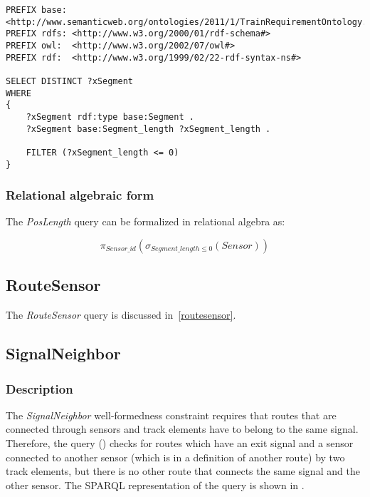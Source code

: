 
\begin{lstlisting}[caption=The PosLength query in SPARQL, label=lst:poslength-sparql]
PREFIX base: <http://www.semanticweb.org/ontologies/2011/1/TrainRequirementOntology.owl#>
PREFIX rdfs: <http://www.w3.org/2000/01/rdf-schema#>
PREFIX owl:  <http://www.w3.org/2002/07/owl#>
PREFIX rdf:  <http://www.w3.org/1999/02/22-rdf-syntax-ns#>

SELECT DISTINCT ?xSegment
WHERE
{
    ?xSegment rdf:type base:Segment .
    ?xSegment base:Segment_length ?xSegment_length .

    FILTER (?xSegment_length <= 0)
}
\end{lstlisting}


\subsubsection{Relational algebraic form} The \textit{PosLength} query can be formalized in relational algebra as:

$$ \pi_{\mathit{Sensor\_id}} \left( \sigma_{\mathit{Segment\_length} \leq 0} \left( \mathit{Sensor} \right) \right) $$

\subsection{RouteSensor}

The \textit{RouteSensor} query is discussed in~\autoref{routesensor}.

\subsection{SignalNeighbor}

\subsubsection{Description} The \textit{SignalNeighbor} well-formedness constraint requires that routes that are connected through sensors and track elements have to belong to the same signal. Therefore, the query () checks for routes which have an exit signal and a sensor connected to another sensor (which is in a definition of another route) by two track elements, but there is no other route that connects the same signal and the other sensor. The SPARQL representation of the query is shown in .

